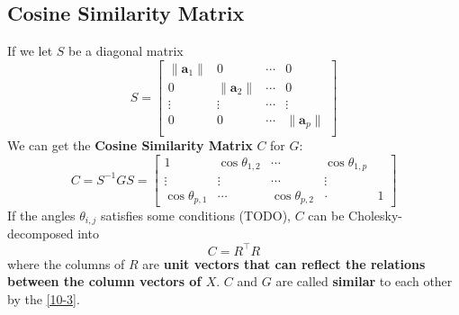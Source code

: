 \subsection{Cosine Similarity Matrix}
    If we let $S$ be a diagonal matrix
    \begin{equation*}
        S = \begin{bmatrix}
            \lVert \mathbf{a}_1 \rVert & 0 & \cdots & 0\\
            0  & \lVert \mathbf{a}_2 \rVert & \cdots & 0\\
            \vdots & \vdots & \cdots & \vdots\\
            0  & 0 & \cdots & \lVert \mathbf{a}_p \rVert\\
        \end{bmatrix}
    \end{equation*}
    We can get the \textbf{Cosine Similarity Matrix} $C$ for $G$:
    \begin{equation*}
        C = S^{-1}GS = 
        \begin{bmatrix}
            1  & \cos \theta_{1, 2} & \cdots & \cos \theta_{1, p}\\
            \vdots & \vdots & \cdots & \vdots\\
            \cos \theta_{p, 1}  & \cdots & \cos\theta_{p, 2} & \cdot & 1
        \end{bmatrix}
    \end{equation*}
    If the angles $\theta_{i, j}$ satisfies some conditions (TODO), $C$ can be Cholesky-decomposed into
    \begin{equation*}
        C = R^{\top}R 
    \end{equation*}
    where the columns of $R$ are \textbf{unit vectors that can reflect the relations between the column vectors of $X$}. $C$ and $G$ are called \textbf{similar} to each other by the \cref{10-3}.